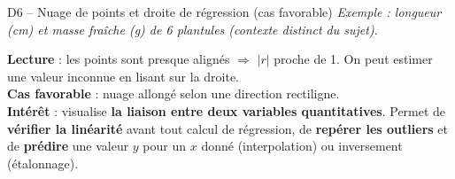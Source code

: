 \documentclass[11pt,a4paper]{article}
\begin{document}
\begin{vignetteCours}{D6 -- Nuage de points et droite de régression (cas favorable)}
\emph{Exemple : longueur (cm) et masse fraîche (g) de 6 plantules (contexte distinct du sujet).}
\begin{center}
\end{center}
\textbf{Lecture} : les points sont presque alignés $\Rightarrow$ $|r|$ proche de 1. On peut estimer une valeur inconnue en lisant sur la droite.\\
\textbf{Cas favorable} : nuage allongé selon une direction rectiligne.\\
\textbf{Intérêt} : visualise \textbf{la liaison entre deux variables quantitatives}. Permet de \textbf{vérifier la linéarité} avant tout calcul de régression, de \textbf{repérer les outliers} et de \textbf{prédire} une valeur $y$ pour un $x$ donné (interpolation) ou inversement (étalonnage).
\end{vignetteCours}
\end{document}
